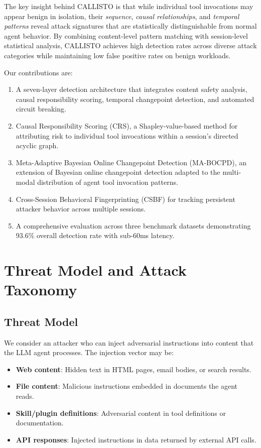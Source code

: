 \documentclass[10pt,conference]{IEEEtran}
\begin{document}
The key insight behind CALLISTO is that while individual tool invocations may appear benign in isolation, their \textit{sequence}, \textit{causal relationships}, and \textit{temporal patterns} reveal attack signatures that are statistically distinguishable from normal agent behavior. By combining content-level pattern matching with session-level statistical analysis, CALLISTO achieves high detection rates across diverse attack categories while maintaining low false positive rates on benign workloads.

Our contributions are:
\begin{enumerate}
    \item A seven-layer detection architecture that integrates content safety analysis, causal responsibility scoring, temporal changepoint detection, and automated circuit breaking.
    \item Causal Responsibility Scoring (CRS), a Shapley-value-based method for attributing risk to individual tool invocations within a session's directed acyclic graph.
    \item Meta-Adaptive Bayesian Online Changepoint Detection (MA-BOCPD), an extension of Bayesian online changepoint detection adapted to the multi-modal distribution of agent tool invocation patterns.
    \item Cross-Session Behavioral Fingerprinting (CSBF) for tracking persistent attacker behavior across multiple sessions.
    \item A comprehensive evaluation across three benchmark datasets demonstrating 93.6\% overall detection rate with sub-60ms latency.
\end{enumerate}

\section{Threat Model and Attack Taxonomy}

\subsection{Threat Model}

We consider an attacker who can inject adversarial instructions into content that the LLM agent processes. The injection vector may be:
\begin{itemize}
    \item \textbf{Web content}: Hidden text in HTML pages, email bodies, or search results.
    \item \textbf{File content}: Malicious instructions embedded in documents the agent reads.
    \item \textbf{Skill/plugin definitions}: Adversarial content in tool definitions or documentation.
    \item \textbf{API responses}: Injected instructions in data returned by external API calls.
\end{itemize}
\end{document}
